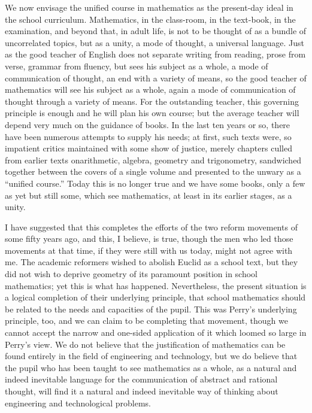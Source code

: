 We now envisage the unified course in mathematics as the present-day ideal in the school curriculum. Mathematics, in the class-room, in the text-book, in the examination, and beyond that, in adult life, is not to be thought of as a bundle of uncorrelated topics, but as a unity, a mode of thought, a universal language. Just as the good teacher of English does not separate writing from reading, prose from verse, grammar from fluency, but sees his subject as a whole, a mode of communication of thought, an end with a variety of means, so the good teacher of mathematics will see his subject as a whole, again a mode of communication of thought through a variety of means. For the outstanding teacher, this governing principle is enough and he will plan his own course; but the average teacher will depend very much on the guidance of books. In the last ten years or so, there have been numerous attempts to supply his needs; at first, such texts were, so impatient critics maintained with some show of justice, merely chapters culled from earlier texts on\pageoriginale arithmetic, algebra, geometry and trigonometry, sandwiched together between the covers of a single volume and presented to the unwary as a ``unified course.'' Today this is no longer true and we have some books, only a few as yet but still some, which see mathematics, at least in its earlier stages, as a unity.

I have suggested that this completes the efforts of the two reform movements of some fifty years ago, and this, I believe, is true, though the men who led those movements at that time, if they were still with us today, might not agree with me. The academic reformers wished to abolish Euclid as a school text, but they did not wish to deprive geometry of its paramount position in school mathematics; yet this is what has happened. Nevertheless, the present situation is a logical completion of their underlying principle, that school mathematics should be related to the needs and capacities of the pupil. This was Perry's underlying principle, too, and we can claim to be completing that movement, though we cannot accept the narrow and one-sided application of it which loomed so large in Perry's view. We do not believe that the justification of mathematics can be found entirely in the field of engineering and technology, but we do believe that the pupil who has been taught to see mathematics as a whole, as a natural and indeed inevitable language for the communication of abstract and rational thought, will find it a natural and indeed inevitable way of thinking about engineering and technological problems.


